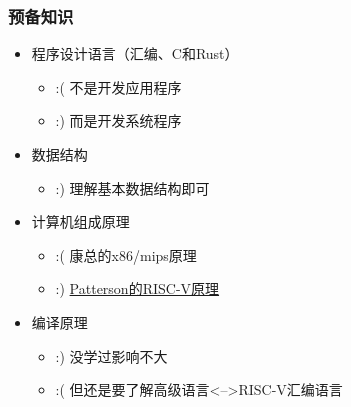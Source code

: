 \begin{frame}

\frametitle{预备知识}

\begin{itemize}

\item 程序设计语言（汇编、C和Rust）
  \begin{itemize}
    \item :( 不是开发应用程序
    \item :) 而是开发系统程序
    \pause
  \end{itemize}
\item 数据结构
  \begin{itemize}
    \item :) 理解基本数据结构即可 
  \end{itemize}
\pause
\item 计算机组成原理
  \begin{itemize}
    \item :( 康总的x86/mips原理 
    \item  :)  \href{http://crva.ict.ac.cn/documents/RISC-V-Reader-Chinese-v2p1.pdf}{Patterson的RISC-V原理}
  \end{itemize}
\pause
\item 编译原理
  \begin{itemize}
    \item :) 没学过影响不大  
    \item :( 但还是要了解高级语言<-->RISC-V汇编语言

  \end{itemize}

\end{itemize}

\end{frame}

